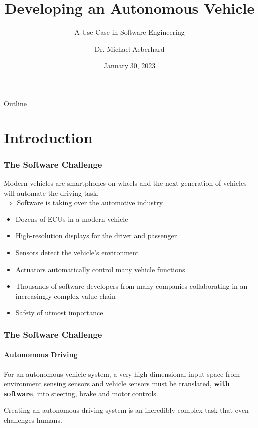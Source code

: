 \documentclass[aspectratio=169]{beamer}
\title{Developing an Autonomous Vehicle}
\subtitle{A Use-Case in Software Engineering}
\author{Dr. Michael Aeberhard}
\date{January 30, 2023}
\begin{document}
\frame{\titlepage}

\begin{frame}{Outline}
    \tableofcontents[hideallsubsections]
\end{frame}


\section{Introduction}





\begin{frame}
\frametitle{The Software Challenge}
Modern vehicles are smartphones on wheels and the next generation of vehicles
will automate the driving task.\\
$\Rightarrow$ Software is taking over the automotive industry
\vspace{0.25cm}
\begin{itemize}
    \item Dozens of ECUs in a modern vehicle
    \item High-resolution displays for the driver and passenger
    \item Sensors detect the vehicle's environment
    \item Actuators automatically control many vehicle functions
    \item Thousands of software developers from many companies collaborating in an increasingly complex value chain
    \item Safety of utmost importance
\end{itemize}
\end{frame}

\begin{frame}
\frametitle{The Software Challenge}
\framesubtitle{Autonomous Driving}
For an autonomous vehicle system, a very high-dimensional input space from
environment sensing sensors and vehicle sensors must be translated,
\textbf{with software}, into steering, brake and motor controls.\\
\begin{block}{}
Creating an autonomous driving system is an incredibly complex task that even
challenges humans.
\end{block}
\end{frame}
\end{document}
